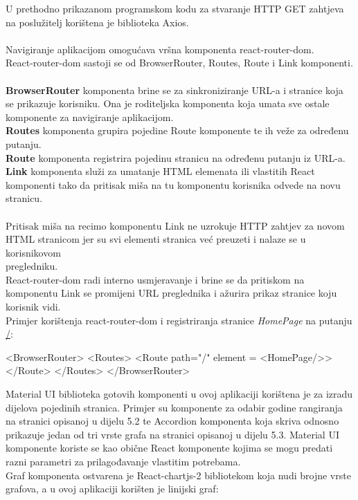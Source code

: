 \documentclass[times, utf8, zavrsni]{fer}
\begin{document}
U prethodno prikazanom programskom kodu za stvaranje HTTP GET zahtjeva na poslužitelj korištena je biblioteka Axios.
\\\\Navigiranje aplikacijom omogućava vršna komponenta react-router-dom.
\\React-router-dom sastoji se od BrowserRouter, Routes, Route i Link komponenti. 
\\\\\textbf{BrowserRouter} komponenta brine se za sinkroniziranje URL-a i stranice koja se prikazuje korisniku. Ona je roditeljska komponenta koja umata sve ostale komponente za navigiranje aplikacijom.
\\\textbf{Routes} komponenta grupira pojedine Route komponente te ih veže za određenu putanju.
\\\textbf{Route} komponenta registrira pojedinu stranicu na određenu putanju iz URL-a.
\\\textbf{Link} komponenta služi za umatanje HTML elemenata ili vlastitih React komponenti tako da pritisak miša na tu komponentu korisnika odvede na novu stranicu.
\\\\Pritisak miša na recimo komponentu Link ne uzrokuje HTTP zahtjev za novom HTML stranicom jer su svi elementi stranica već preuzeti i nalaze se u korisnikovom \\pregledniku.
\\React-router-dom radi interno usmjeravanje i brine se da pritiskom na komponentu Link se promijeni URL preglednika i ažurira prikaz stranice koju korisnik vidi.
\\Primjer korištenja react-router-dom i registriranja stranice \emph{HomePage} na putanju \url{/}:
\begin{verbnobox}[\fontsize{10pt}{10pt}\selectfont]
<BrowserRouter>
    <Routes>
        <Route path="/" element = {<HomePage/>}></Route>
    </Routes>
</BrowserRouter>
\end{verbnobox}
Material UI biblioteka gotovih komponenti u ovoj aplikaciji korištena je za izradu dijelova pojedinih stranica. Primjer su komponente za odabir godine rangiranja
na stranici opisanoj u dijelu 5.2 te Accordion komponenta koja skriva odnosno prikazuje jedan od tri vrste grafa na stranici opisanoj u dijelu 5.3.
Material UI komponente koriste se kao obične React komponente kojima se mogu predati razni parametri za prilagođavanje vlastitim potrebama.
\\Graf komponenta ostvarena je React-chartjs-2 bibliotekom koja nudi brojne vrste grafova, a u ovoj aplikaciji korišten je linijski graf:
\end{document}
